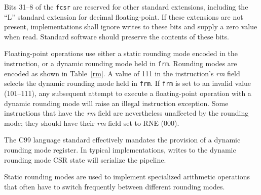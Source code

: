 Bits 31--8 of the {\tt fcsr} are reserved for other standard extensions,
including the ``L'' standard extension for decimal floating-point.  If
these extensions are not present, implementations shall ignore writes to
these bits and supply a zero value when read.  Standard software should
preserve the contents of these bits.

Floating-point operations use either a static rounding mode encoded in the
instruction, or a dynamic rounding mode held in {\tt frm}.  Rounding modes are
encoded as shown in Table~\ref{rm}.  A value of 111 in the instruction's {\em
rm} field selects the dynamic rounding mode held in {\tt frm}.  If {\tt frm}
is set to an invalid value (101--111), any subsequent attempt to execute
a floating-point operation with a dynamic rounding mode will raise an illegal
instruction exception.  Some instructions that have the {\em rm} field are
nevertheless unaffected by the rounding mode; they should have their {\em rm}
field set to RNE (000).

\begin{commentary}
The C99 language standard effectively mandates the provision of a
dynamic rounding mode register.  In typical implementations, writes to
the dynamic rounding mode CSR state will serialize the pipeline.

Static rounding modes are used to implement specialized arithmetic
operations that often have to switch frequently between different
rounding modes.
\end{commentary}
\newpage
 
